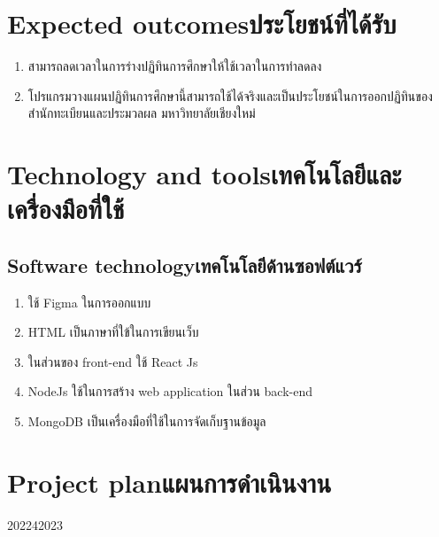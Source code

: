 \section{\ifenglish Expected outcomes\else ประโยชน์ที่ได้รับ\fi}
\begin{enumerate}
\item สามารถลดเวลาในการร่างปฏิทินการศึกษาให้ใช้เวลาในการทำลดลง
\item โปรแกรมวางแผนปฏิทินการศึกษานี้สามารถใช้ได้จริงและเป็นประโยชน์ในการออกปฏิทินของ \\ สำนักทะเบียนและประมวลผล มหาวิทยาลัยเชียงใหม่
\end{enumerate}

\section{\ifenglish Technology and tools\else เทคโนโลยีและเครื่องมือที่ใช้\fi}


\subsection{\ifenglish Software technology\else เทคโนโลยีด้านซอฟต์แวร์\fi}
\begin{enumerate}
\item ใช้ Figma ในการออกแบบ
\item HTML เป็นภาษาที่ใข้ในการเขียนเว็บ 
\item ในส่วนของ front-end ใช้ React Js 
\item NodeJs ใช้ในการสร้าง web application ในส่วน back-end 
\item MongoDB เป็นเครื่องมือที่ใช้ในการจัดเก็บฐานข้อมูล
\end{enumerate}

\section{\ifenglish Project plan\else แผนการดำเนินงาน\fi}

\begin{plan}{1}{2022}{4}{2023}
\end{plan}

